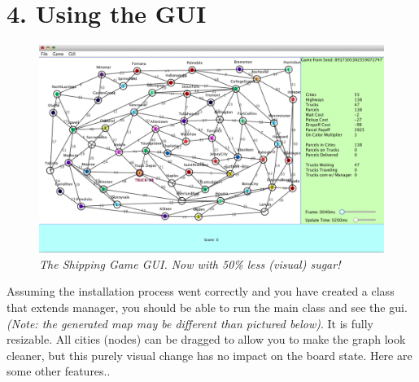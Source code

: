 \documentclass[11pt]{article}
\begin{document}
\section{4. Using the GUI}
\begin{figure}[h]
\centerline{\includegraphics[scale=0.45]{gui.png}} 
\caption{\em{The Shipping Game GUI. Now with 50\% less (visual) sugar!}}
\end{figure}

Assuming the installation process went correctly and you have created a class that extends manager, you should be able to run the main class and see the gui. {\em(Note: the generated map may be different than pictured below)}. It is fully resizable. All cities (nodes) can be dragged to allow you to make the graph look cleaner, but  this purely visual change has no impact on the board state. Here are some other features.. 
\end{document}
